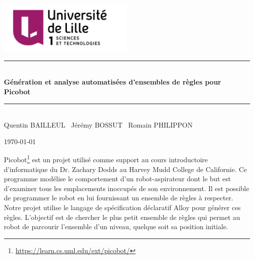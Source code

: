 \documentclass{article}
\newcommand{\HRule}{\rule{\linewidth}{0.5mm}}
\begin{document}


\begin{titlepage}
\begin{center}

\includegraphics[width=0.5\textwidth]{pictures/ul.png}~\\[1cm]

\HRule \\[0.2cm]
{ \huge \bfseries Génération et analyse automatisées d’ensembles de règles pour Picobot \\[0.4cm] }

\HRule \\[1.5cm]
Quentin BAILLEUL \  Jérémy BOSSUT \  Romain PHILIPPON

\vfill

{\large \today}

\end{center}
\end{titlepage}

\newpage
\tableofcontents

\newpage


Picobot\footnote{\label{pico_lien}\url{https://learn.cs.uml.edu/ext/picobot/}} est un projet utilisé comme support au cours introductoire d'informatique du Dr. Zachary Dodds au Harvey Mudd College de Californie. Ce programme modélise le comportement d’un robot-aspirateur dont le but est d’examiner tous les emplacements inoccupés de son environnement. Il est possible de programmer le robot en lui fournissant un ensemble de règles à respecter.
\\

Notre projet utilise le langage de spécification déclaratif Alloy pour générer ces règles. L'objectif est de chercher le plus petit ensemble de règles qui permet au robot de parcourir l’ensemble d’un niveau, quelque soit sa position initiale.
\\
\end{document}
